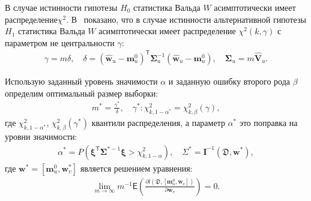 В случае истинности гипотезы $H_0$ статистика Вальда $W$ асимптотически имеет распределение$\chi^2$. В~\cite{shieh2005} показано, что в случае истинности альтернативной гипотезы $H_1$ статистика Вальда $W$ асимптотически имеет распределение $\chi^2(k,\gamma)$ с параметром не центральности $\gamma$:
\[
\label{eq:sb:17}
\begin{aligned}
	\gamma = m\delta, \quad \delta = \left(\hat{\textbf{w}}_{u} - \textbf{m}_{u}^{0}\right)^{\mathsf{T}}\bm{\Sigma}^{-1}_u\left(\hat{\textbf{w}}_{u} - \textbf{m}_{u}^{0}\right), \quad \bm{\Sigma}_u = m\hat{\textbf{V}}_u.
\end{aligned}
\]

Использую заданный уровень значимости $\alpha$ и заданную ошибку второго рода $\beta$ определим оптимальный размер выборки:
\[
\label{eq:sb:18}
\begin{aligned}
	m^* = \frac{\gamma^*}{\delta}, \quad \gamma^*:\chi^2_{k, 1-\alpha^{*}} = \chi^2_{k, \beta}\left(\gamma\right),
\end{aligned}
\]
где $\chi^2_{k, 1-\alpha^*}$, $\chi^2_{k, \beta}\left(\gamma^*\right)$ квантили распределения, а параметр $\alpha^*$ это поправка на уровни значимости:
\[
\label{eq:sb:19}
\begin{aligned}
	\alpha^* = P\left(\bm{\xi}^{\mathsf{T}}\bm{\Sigma}^{*-1} \bm{\xi} > \chi^2_{k,1 - \alpha}\right), \quad \Sigma^* = \textbf{I}^{-1}\left(\mathfrak{D}, \textbf{w}^*\right),
\end{aligned}
\]
где $\textbf{w}^{*} = \left[\textbf{m}_{u}^{0}, \textbf{w}^{*}_v\right]$ является решением уравнения:
\[
\label{eq:sb:20}
\begin{aligned}
	\lim_{m\to\infty}m^{-1}\mathsf{E}\left(\frac{\partial l\left(\mathfrak{D}, \left[ \textbf{m}_{u}^{0}, \textbf{w}_{v}\right]\right)}{\partial \textbf{w}_{v}}\right) = 0.
\end{aligned}
\]

